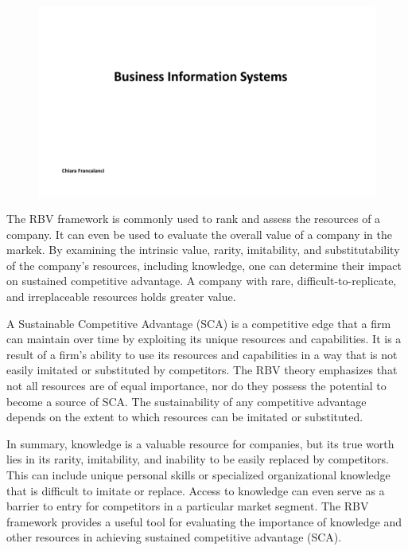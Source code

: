\begin{figure}[!h]
    \centering
    \includegraphics[page=7, trim = 1.5cm 2cm 1.5cm 3cm, clip, width=\textwidth]{images/05 - KM.pdf}
\end{figure}

The RBV framework is commonly used to rank and assess the resources of a
company. It can even be used to evaluate the overall value of a company
in the markek. By examining the intrinsic value, rarity, imitability,
and substitutability of the company's resources, including knowledge,
one can determine their impact on sustained competitive advantage. A
company with rare, difficult-to-replicate, and irreplaceable resources
holds greater value.

A Sustainable Competitive Advantage (SCA) is a competitive edge that a firm can maintain over time by exploiting its unique resources and capabilities. It is a result of a firm's ability to use its resources and capabilities in a way that is not easily imitated or substituted by competitors. The RBV theory emphasizes that not all resources are of equal importance, nor do they possess the potential to become a source of SCA. The sustainability of any competitive advantage depends on the extent to which resources can be imitated or substituted.

In summary, knowledge is a valuable resource for companies, but its true
worth lies in its rarity, imitability, and inability to be easily
replaced by competitors. This can include unique
personal skills or specialized organizational knowledge that is
difficult to imitate or replace. Access to knowledge can even serve as a
barrier to entry for competitors in a particular market segment. The RBV framework provides a useful tool for evaluating the importance of knowledge and other resources in achieving
sustained competitive advantage (SCA).

